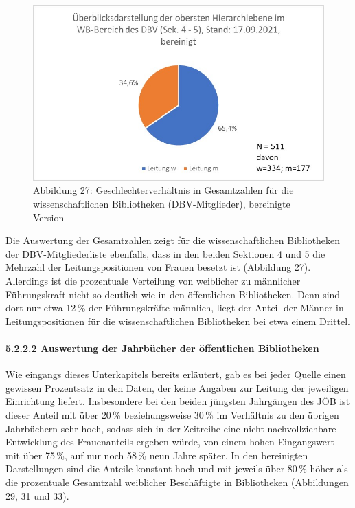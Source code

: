 \documentclass[a4paper,
fontsize=11pt,
oneside,
numbers=noperiodatend,
parskip=half-,
bibliography=totoc,
final
]{scrartcl}
\begin{document}
\begin{figure}
\centering
\includegraphics{img/Abb_27_DBV-Sek4-5_gesamt_bereinigt.jpg}
\caption{Abbildung 27: Geschlechterverhältnis in Gesamtzahlen für die
wissenschaftlichen Bibliotheken (DBV-Mitglieder), bereinigte Version}
\end{figure}

Die Auswertung der Gesamtzahlen zeigt für die wissenschaftlichen
Bibliotheken der DBV-Mit\-glied\-er\-liste ebenfalls, dass in den beiden
Sektionen 4 und 5 die Mehrzahl der Leitungspositionen von Frauen besetzt
ist (Abbildung 27). Allerdings ist die prozentuale Verteilung von
weiblicher zu männlicher Führungskraft nicht so deutlich wie in den
öffentlichen Bibliotheken. Denn sind dort nur etwa 12\,\% der
Führungskräfte männlich, liegt der Anteil der Männer in
Leitungspositionen für die wissenschaftlichen Bibliotheken bei etwa
einem Drittel.

\paragraph{5.2.2.2 Auswertung der Jahrbücher der öffentlichen Bibliotheken}

Wie eingangs dieses Unterkapitels bereits erläutert, gab es bei jeder
Quelle einen gewissen Prozentsatz in den Daten, der keine Angaben zur
Leitung der jeweiligen Einrichtung liefert. Insbesondere bei den beiden
jüngsten Jahrgängen des JÖB ist dieser Anteil mit über 20\,\%
beziehungsweise 30\,\% im Verhältnis zu den übrigen Jahrbüchern sehr hoch,
sodass sich in der Zeitreihe eine nicht nachvollziehbare Entwicklung des
Frauenanteils ergeben würde, von einem hohen Eingangswert mit über 75\,\%,
auf nur noch 58\,\% neun Jahre später. In den bereinigten Darstellungen
sind die Anteile konstant hoch und mit jeweils über 80\,\% höher als die
prozentuale Gesamtzahl weiblicher Beschäftigte in Bibliotheken
(Abbildungen 29, 31 und 33).
\end{document}
